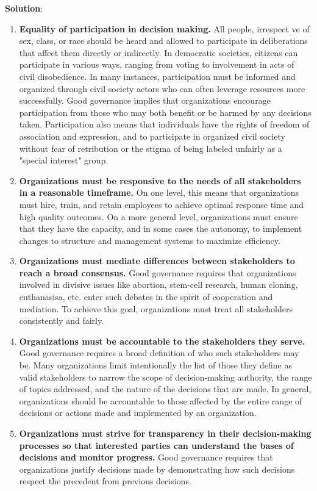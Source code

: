 \documentclass[
  openany]{book}
\newenvironment{solution}{ {\bfseries Solution}:}{}
\begin{document}
\begin{questions}
\begin{solution}
\begin{enumerate}
\item \textbf{Equality of participation in decision making.} All people, irrespect ve of sex, class, or race should be heard and allowed to participate in deliberations that affect them directly or indirectly. In democratic societies, citizens can participate in various ways, ranging from voting to involvement in acts of civil disobedience. In many instances, participation must be informed and organized through civil society actors who can often leverage resources more successfully. Good governance implies that organizations encourage participation from those who may both benefit or be harmed by any decisions taken. Participation also means that individuals have the rights of freedom of association and expression, and to participate in organized civil society without fear of retribution or the stigma of being labeled unfairly as a "special interest" group.
\item \textbf{Organizations must be responsive to the needs of all stakeholders in a reasonable timeframe.} On one level, this means that organizations must hire, train, and retain employees to achieve optimal response time and high quality outcomes. On a more general level, organizations must ensure that they have the capacity, and in some cases the autonomy, to implement changes to structure and management systems to maximize efficiency.
\item \textbf{Organizations must mediate differences between stakeholders to reach a broad consensus.} Good governance requires that organizations involved in divisive issues like abortion, stem-cell research, human cloning, euthanasisa, etc. enter such debates in the spirit of cooperation and mediation. To achieve this goal, organizations must treat all stakeholders consistently and fairly.
\item \textbf{Organizations must be accountable to the stakeholders they serve.} Good governance requires a broad definition of who such stakeholders may be. Many organizations limit intentionally the list of those they define as valid stakeholders to narrow the scope of decision-making authority, the range of topics addressed, and the nature of the decisions that are made. In general, organizations should be accountable to those affected by the entire range of decisions or actions made and implemented by an organization.
\item \textbf{Organizations must strive for transparency in their decision-making processes so that interested parties can understand the bases of decisions and monitor progress.} Good governance requires that organizations justify decisions made by demonstrating how such decisions respect the precedent from previous decisions.

\end{enumerate}
\end{solution}
\end{questions}
\end{document}
